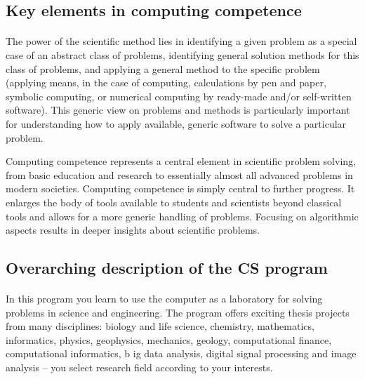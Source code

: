 \documentclass[%
oneside,                 %
final,                   %
10pt]{article}
\begin{document}
\noindent



\subsection{Key elements in computing competence}

\paragraph{}
The power of the scientific method lies in identifying a given problem
as a special case of an abstract class of problems, identifying
general solution methods for this class of problems, and applying a
general method to the specific problem (applying means, in the case of
computing, calculations by pen and paper, symbolic computing, or
numerical computing by ready-made and/or self-written software). This
generic view on problems and methods is particularly important for
understanding how to apply available, generic software to solve a
particular problem.

Computing competence represents a central element
in scientific problem solving, from basic education and research to
essentially almost all advanced problems in modern
societies. Computing competence is simply central to further
progress. It enlarges the body of tools available to students and
scientists beyond classical tools and allows for a more generic
handling of problems. Focusing on algorithmic aspects results in
deeper insights about scientific problems.



\subsection{Overarching description of the CS program}

\paragraph{}
In this program you learn to use the computer as a laboratory for
solving problems in science and engineering. The program offers
exciting thesis projects from many disciplines: biology and life
science, chemistry, mathematics, informatics, physics, geophysics,
mechanics, geology, computational finance, computational informatics, b
ig data analysis, digital signal processing
and image analysis – you select research field according to
your interests.
\end{document}
